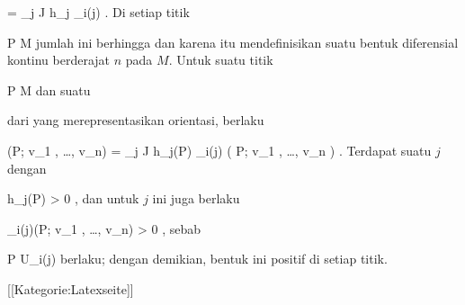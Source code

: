 {{\mavergleichskettedisp
{\vergleichskette
{ \omega
}
{ =} { \sum_{j \in J} h_j \omega_{i(j)}
}
{ } {
}
{ } {
}
{ } {
}
}
{}{}{.}
Di setiap titik

\mavergleichskette
{\vergleichskette
{ P
}
{ \in }{ M
}
{  }{
}
{    }{
}
{   }{
}
}
{}{}{}
jumlah ini berhingga dan karena itu mendefinisikan suatu bentuk diferensial kontinu berderajat $n$ pada $M$. Untuk suatu titik

\mavergleichskette
{\vergleichskette
{ P
}
{ \in }{ M
}
{  }{
}
{    }{
}
{   }{
}
}
{}{}{}
dan suatu

 dari
 yang merepresentasikan orientasi, berlaku

\mavergleichskettedisp
{\vergleichskette
{ \omega(P; v_1 , \ldots , v_n)
}
{ =} { \sum_{j \in J} h_j(P) \omega_{i(j)} \left(  P; v_1 , \ldots , v_n  \right)
}
{ } {
}
{ } {
}
{ } {
}
}
{}{}{.}
Terdapat suatu $j$ dengan

\mavergleichskette
{\vergleichskette
{ h_j(P)
}
{ > }{ 0
}
{  }{
}
{    }{
}
{   }{
}
}
{}{}{,}
dan untuk $j$ ini juga berlaku

\mavergleichskette
{\vergleichskette
{ \omega_{i(j)}(P; v_1 , \ldots , v_n)
}
{ > }{ 0
}
{  }{
}
{    }{
}
{   }{
}
}
{}{}{,}
sebab

\mavergleichskette
{\vergleichskette
{ P
}
{ \in }{ U_{i(j)}
}
{  }{
}
{    }{
}
{   }{
}
}
{}{}{}
berlaku; dengan demikian, bentuk ini positif di setiap titik.}
{}

}

 [[Kategorie:Latexseite]]
